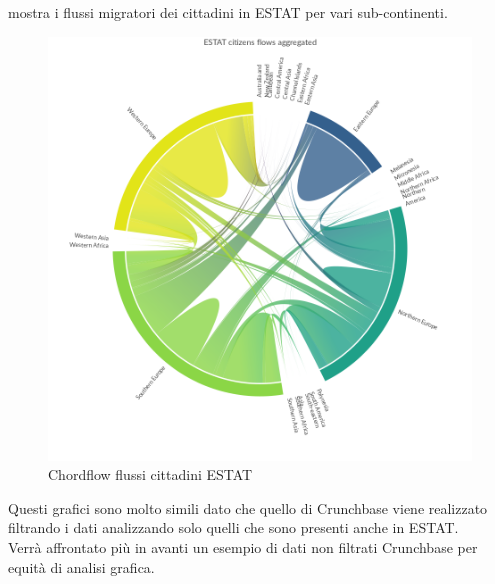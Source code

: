 mostra i flussi migratori dei cittadini %
in ESTAT per vari sub-continenti. 
\begin{figure}[t]
    \centering
    \includegraphics[width=1.0\textwidth]{images/ChordFlows/ESTAT_cit_True.png}
    \caption{Chordflow flussi cittadini ESTAT}
    \label{fig:chordestatcittrue}
\end{figure}
Questi grafici sono molto simili dato che quello di Crunchbase viene realizzato filtrando i dati analizzando solo quelli che sono presenti anche in ESTAT.\\ Verrà affrontato più in avanti un esempio di dati non filtrati Crunchbase per equità di analisi grafica. 



